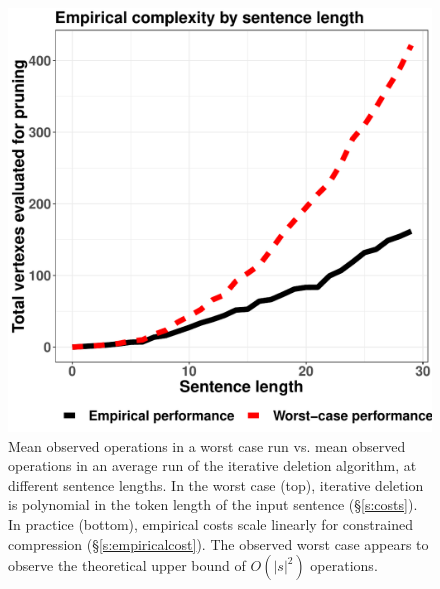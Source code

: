 \documentclass[11pt,a4paper]{article}
\newcommand{\ahcomment}[1]{\textcolor{blue}{[#1 -AH]}}
\begin{document}
\begin{figure}[htb!]
\centering
\includegraphics[width=.5\textwidth]{observed.pdf}
\caption{Mean observed operations in a worst case run vs. mean observed operations in an average run of the iterative deletion algorithm, at different sentence lengths. In the worst case (top), iterative deletion is polynomial in the token length of the input sentence (\S\ref{s:costs}). In practice (bottom), empirical costs scale linearly for constrained compression (\S\ref{s:empiricalcost}). The observed worst case appears to observe the theoretical upper bound of $O(|s|^2)$ operations.}
\label{f:example}
\end{figure}



\end{document}
